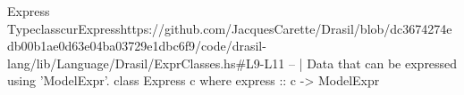 \begin{haskell}{Express Typeclass}{curExpress}{https://github.com/JacquesCarette/Drasil/blob/dc3674274edb00b1ae0d63e04ba03729e1dbc6f9/code/drasil-lang/lib/Language/Drasil/ExprClasses.hs\#L9-L11}
-- | Data that can be expressed using 'ModelExpr'.
class Express c where
  express :: c -> ModelExpr
\end{haskell}
